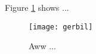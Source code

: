 \documentclass{article}
\begin{document}
Figure \ref{fig:gerbil} shows ...

\begin{figure}
\centering
\texttt{[image: gerbil]}
\caption{\label{fig:gerbil} Aww ...}
\end{figure}
\end{document}
